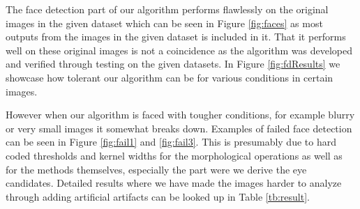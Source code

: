 
The face detection part of our algorithm performs flawlessly on the original images in the given dataset which can be seen in Figure \ref{fig:faces} as most outputs from the images in the given dataset is included in it. That it performs well on these original images is not a coincidence as the algorithm was developed and verified through testing on the given datasets. In Figure \ref{fig:fdResults} we showcase how tolerant our algorithm can be for various conditions in certain images.



% 


However when our algorithm is faced with tougher conditions, for example blurry  or very small images it somewhat breaks down. Examples of failed face detection can be seen in Figure \ref{fig:fail1} and \ref{fig:fail3}. This is presumably due to hard coded thresholds and kernel widths for the morphological operations as well as for the methods themselves, especially the part were we derive the eye candidates. Detailed results where we have made the images harder to analyze through adding artificial artifacts can be looked up in Table \ref{tb:result}.

